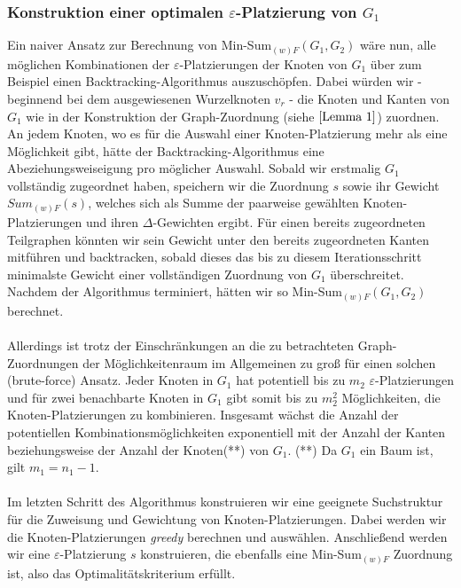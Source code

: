\documentclass[a4paper, 12pt, twoside]{article}
\theoremstyle{Format1} %
\begin{document}
\subsubsection{Konstruktion einer optimalen $\varepsilon$-Platzierung von $G_1$}
Ein naiver Ansatz zur Berechnung von Min-Sum$_{(w)F}(G_1,G_2)$ wäre nun, alle möglichen Kombinationen der $\varepsilon$-Platzierungen der Knoten von $G_1$ über zum Beispiel einen Backtracking-Algorithmus auszuschöpfen.
Dabei würden wir - beginnend bei dem ausgewiesenen Wurzelknoten $v_r$ - die Knoten und Kanten von $G_1$ wie in der Konstruktion der Graph-Zuordnung (siehe $\ref{Lemma 1}$) zuordnen.
An jedem Knoten, wo es für die Auswahl einer Knoten-Platzierung mehr als eine Möglichkeit gibt, hätte der Backtracking-Algorithmus eine Abeziehungsweiseigung pro möglicher Auswahl.
Sobald wir erstmalig $G_1$ vollständig zugeordnet haben, speichern wir die Zuordnung $s$ sowie ihr Gewicht $Sum_{(w)F}(s)$, welches sich als Summe der
paarweise gewählten Knoten-Platzierungen und ihren $\Delta$-Gewichten ergibt.
Für einen bereits zugeordneten Teilgraphen könnten wir sein Gewicht unter den bereits zugeordneten Kanten mitführen und backtracken, sobald dieses das bis zu diesem Iterationsschritt
minimalste Gewicht einer vollständigen Zuordnung von $G_1$ überschreitet. Nachdem der Algorithmus terminiert, hätten wir so Min-Sum$_{(w)F}(G_1,G_2)$ berechnet.
\\
\\
Allerdings ist trotz der Einschränkungen an die zu betrachteten Graph-Zuordnungen der Möglichkeitenraum im Allgemeinen zu groß
für einen solchen (brute-force) Ansatz.
Jeder Knoten in $G_1$ hat potentiell bis zu $m_2$ $\varepsilon$-Platzierungen und für
zwei benachbarte Knoten in $G_1$ gibt somit bis zu $m_2^2$ Möglichkeiten, die Knoten-Platzierungen zu kombinieren.
Insgesamt wächst die Anzahl der potentiellen Kombinationsmöglichkeiten exponentiell mit der Anzahl der Kanten beziehungsweise der Anzahl der Knoten(**) von $G_1$.
(**) Da $G_1$ ein Baum ist, gilt $m_1 = n_1-1$.
\\
\\
Im letzten Schritt des Algorithmus konstruieren wir eine geeignete Suchstruktur für die Zuweisung und Gewichtung von Knoten-Platzierungen.
Dabei werden wir die Knoten-Platzierungen \textit{greedy} berechnen und auswählen.
Anschließend werden wir eine $\varepsilon$-Platzierung $s$ konstruieren, die ebenfalls eine Min-Sum$_{(w)F}$ Zuordnung ist, also das Optimalitätskriterium erfüllt.
\\
\\
\end{document}
